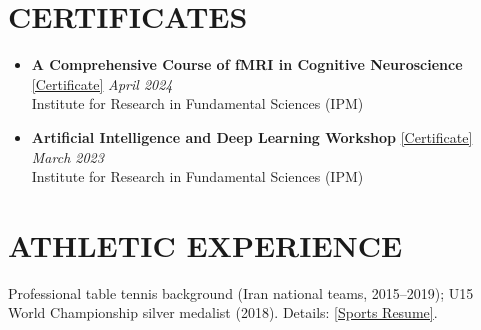 \documentclass[11pt,a4paper,roman]{moderncv}        %
\begin{document}
    \vspace{-2mm}
    \section{CERTIFICATES}
        \begin{itemize}
            \item \textbf{A Comprehensive Course of fMRI in Cognitive Neuroscience} \href{https://drive.google.com/file/d/1pSHAdNUjA29HwdbSiitbg2cin_NpgTJC/view?usp=share_link}{\textcolor{blue link}{[Certificate]}} \hfill{\emph{April 2024}} \\ Institute for Research in Fundamental Sciences (IPM)
            \item \textbf{Artificial Intelligence and Deep Learning Workshop} \href{https://drive.google.com/file/d/1dfqOSd3fd7roU33iBSn3Lqtq7-H1gBhl/view?usp=share_link}{\textcolor{blue link}{[Certificate]}} \hfill{\emph{March 2023}} \\ Institute for Research in Fundamental Sciences (IPM)
        \end{itemize}

\section{ATHLETIC EXPERIENCE}
Professional table tennis background (Iran national teams, 2015--2019); U15 World Championship silver medalist (2018). Details: \href{https://drive.google.com/file/d/1iYFyVzTf1yFYciEZKdIxgTfaY-gfVPqr/view?usp=share_link}{\textcolor{blue link}{[Sports Resume]}}.
	
	
\end{document}
